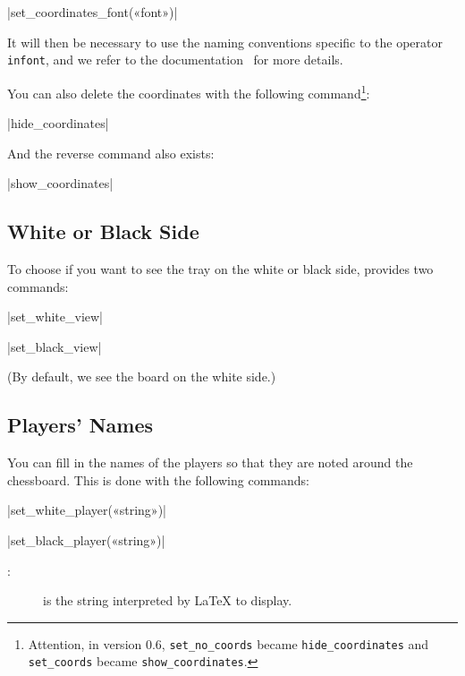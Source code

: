 \documentclass[english]{ltxdoc}
\begin{document}
\commande|set_coordinates_font(«font»)|\smallskip

It will then be necessary to use the naming conventions specific to the \MP{}
operator
\lstinline+infont+, and we refer to the
\MP{} documentation~\cite{ctan-metapost} for more details.

You can also delete the coordinates with the following command\footnote{Attention,
in version 0.6, \lstinline+set_no_coords+ became
\lstinline+hide_coordinates+ and \lstinline+set_coords+ became
\lstinline+show_coordinates+.}:

\commande|hide_coordinates|\smallskip

And the reverse command also exists:

\commande|show_coordinates|\smallskip


\subsection{White or Black Side}

To choose if you want to see the tray on the white or black side, \mpchess
provides two commands:

\commande|set_white_view|\smallskip

\commande|set_black_view|\smallskip

(By default, we see the board on the white side.)

\subsection{Players' Names}

You can fill in the names of the players so that they are noted around the
chessboard. This is done with the following commands: 

\commande|set_white_player(«string»)|\smallskip

\commande|set_black_player(«string»)|\smallskip

\begin{description}
  \item[ :] is the string interpreted by \LaTeX{} to display.
\end{description}
\end{document}
